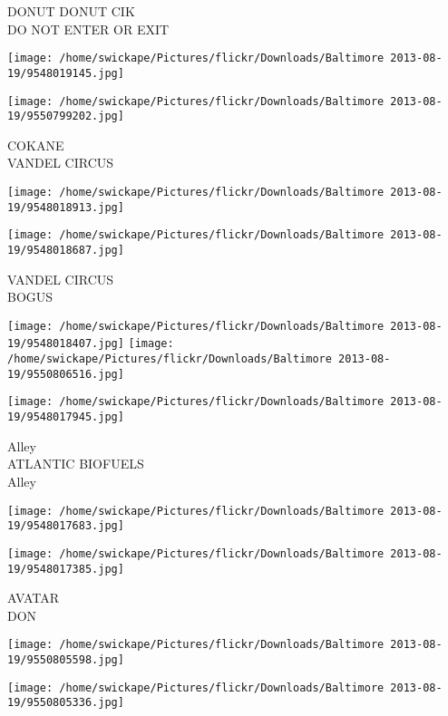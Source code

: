 \documentclass[10pt,letterpaper]{article}
\begin{document}
DONUT DONUT CIK\\
DO NOT ENTER OR EXIT\\
\pagebreak

\texttt{[image: /home/swickape/Pictures/flickr/Downloads/Baltimore 2013-08-19/9548019145.jpg]}

\vspace{0.25in}
\texttt{[image: /home/swickape/Pictures/flickr/Downloads/Baltimore 2013-08-19/9550799202.jpg]}

COKANE\\
VANDEL CIRCUS\\
\pagebreak

\texttt{[image: /home/swickape/Pictures/flickr/Downloads/Baltimore 2013-08-19/9548018913.jpg]}

\vspace{0.25in}
\texttt{[image: /home/swickape/Pictures/flickr/Downloads/Baltimore 2013-08-19/9548018687.jpg]}

VANDEL CIRCUS\\
BOGUS\\
\pagebreak

\texttt{[image: /home/swickape/Pictures/flickr/Downloads/Baltimore 2013-08-19/9548018407.jpg]}
\texttt{[image: /home/swickape/Pictures/flickr/Downloads/Baltimore 2013-08-19/9550806516.jpg]}

\texttt{[image: /home/swickape/Pictures/flickr/Downloads/Baltimore 2013-08-19/9548017945.jpg]}

Alley\\
ATLANTIC BIOFUELS\\
Alley\\
\pagebreak

\texttt{[image: /home/swickape/Pictures/flickr/Downloads/Baltimore 2013-08-19/9548017683.jpg]}

\vspace{0.25in}
\texttt{[image: /home/swickape/Pictures/flickr/Downloads/Baltimore 2013-08-19/9548017385.jpg]}

AVATAR\\
DON\\
\pagebreak

\texttt{[image: /home/swickape/Pictures/flickr/Downloads/Baltimore 2013-08-19/9550805598.jpg]}

\vspace{0.25in}
\texttt{[image: /home/swickape/Pictures/flickr/Downloads/Baltimore 2013-08-19/9550805336.jpg]}
\end{document}
